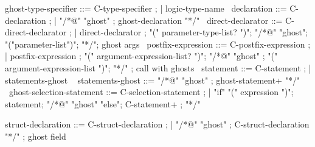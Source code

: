\begin{syntax}

  ghost-type-specifier ::= C-type-specifier ;
  | { logic-type-name } \
  declaration ::= C-declaration ;
  | { "/*@" "ghost" } ;
     { ghost-declaration "*/" } \
  direct-declarator ::= C-direct-declarator ;
    | direct-declarator ;
    "(" parameter-type-list? ")";
        {"/*@" "ghost"};
          {"("parameter-list")"};
          {"*/"}; ghost args
        \
  postfix-expression ::= C-postfix-expression ;
    | postfix-expression ;
     "(" argument-expression-list? ")";
     {"/*@" "ghost"} ;
     {  "(" argument-expression-list ")"};
     {  "*/"} ; call with ghosts
    \
  statement ::= C-statement ;
             | { statements-ghost } \
  { statements-ghost } ::= { "/*@" "ghost" };
                       { ghost-statement+ "*/" } \
  ghost-selection-statement ::= C-selection-statement ;
    | "if" "(" expression ")";
       statement;
      {"/*@" "ghost" "else"};
      {  C-statement+ };
      {  "*/"} \

  struct-declaration ::= C-struct-declaration ;
  | {"/*@" "ghost" };
    {C-struct-declaration "*/"} ; ghost field

\end{syntax}
